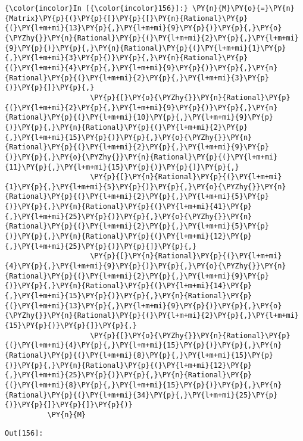     \begin{Verbatim}[commandchars=\\\{\}]
{\color{incolor}In [{\color{incolor}156}]:} \PY{n}{M}\PY{o}{=}\PY{n}{Matrix}\PY{p}{(}\PY{p}{[}\PY{p}{[}\PY{n}{Rational}\PY{p}{(}\PY{l+m+mi}{13}\PY{p}{,}\PY{l+m+mi}{9}\PY{p}{)}\PY{p}{,}\PY{o}{\PYZhy{}}\PY{n}{Rational}\PY{p}{(}\PY{l+m+mi}{2}\PY{p}{,}\PY{l+m+mi}{9}\PY{p}{)}\PY{p}{,}\PY{n}{Rational}\PY{p}{(}\PY{l+m+mi}{1}\PY{p}{,}\PY{l+m+mi}{3}\PY{p}{)}\PY{p}{,}\PY{n}{Rational}\PY{p}{(}\PY{l+m+mi}{4}\PY{p}{,}\PY{l+m+mi}{9}\PY{p}{)}\PY{p}{,}\PY{n}{Rational}\PY{p}{(}\PY{l+m+mi}{2}\PY{p}{,}\PY{l+m+mi}{3}\PY{p}{)}\PY{p}{]}\PY{p}{,}
                    \PY{p}{[}\PY{o}{\PYZhy{}}\PY{n}{Rational}\PY{p}{(}\PY{l+m+mi}{2}\PY{p}{,}\PY{l+m+mi}{9}\PY{p}{)}\PY{p}{,}\PY{n}{Rational}\PY{p}{(}\PY{l+m+mi}{10}\PY{p}{,}\PY{l+m+mi}{9}\PY{p}{)}\PY{p}{,}\PY{n}{Rational}\PY{p}{(}\PY{l+m+mi}{2}\PY{p}{,}\PY{l+m+mi}{15}\PY{p}{)}\PY{p}{,}\PY{o}{\PYZhy{}}\PY{n}{Rational}\PY{p}{(}\PY{l+m+mi}{2}\PY{p}{,}\PY{l+m+mi}{9}\PY{p}{)}\PY{p}{,}\PY{o}{\PYZhy{}}\PY{n}{Rational}\PY{p}{(}\PY{l+m+mi}{11}\PY{p}{,}\PY{l+m+mi}{15}\PY{p}{)}\PY{p}{]}\PY{p}{,}
                    \PY{p}{[}\PY{n}{Rational}\PY{p}{(}\PY{l+m+mi}{1}\PY{p}{,}\PY{l+m+mi}{5}\PY{p}{)}\PY{p}{,}\PY{o}{\PYZhy{}}\PY{n}{Rational}\PY{p}{(}\PY{l+m+mi}{2}\PY{p}{,}\PY{l+m+mi}{5}\PY{p}{)}\PY{p}{,}\PY{n}{Rational}\PY{p}{(}\PY{l+m+mi}{41}\PY{p}{,}\PY{l+m+mi}{25}\PY{p}{)}\PY{p}{,}\PY{o}{\PYZhy{}}\PY{n}{Rational}\PY{p}{(}\PY{l+m+mi}{2}\PY{p}{,}\PY{l+m+mi}{5}\PY{p}{)}\PY{p}{,}\PY{n}{Rational}\PY{p}{(}\PY{l+m+mi}{12}\PY{p}{,}\PY{l+m+mi}{25}\PY{p}{)}\PY{p}{]}\PY{p}{,}
                    \PY{p}{[}\PY{n}{Rational}\PY{p}{(}\PY{l+m+mi}{4}\PY{p}{,}\PY{l+m+mi}{9}\PY{p}{)}\PY{p}{,}\PY{o}{\PYZhy{}}\PY{n}{Rational}\PY{p}{(}\PY{l+m+mi}{2}\PY{p}{,}\PY{l+m+mi}{9}\PY{p}{)}\PY{p}{,}\PY{n}{Rational}\PY{p}{(}\PY{l+m+mi}{14}\PY{p}{,}\PY{l+m+mi}{15}\PY{p}{)}\PY{p}{,}\PY{n}{Rational}\PY{p}{(}\PY{l+m+mi}{13}\PY{p}{,}\PY{l+m+mi}{9}\PY{p}{)}\PY{p}{,}\PY{o}{\PYZhy{}}\PY{n}{Rational}\PY{p}{(}\PY{l+m+mi}{2}\PY{p}{,}\PY{l+m+mi}{15}\PY{p}{)}\PY{p}{]}\PY{p}{,}
                    \PY{p}{[}\PY{o}{\PYZhy{}}\PY{n}{Rational}\PY{p}{(}\PY{l+m+mi}{4}\PY{p}{,}\PY{l+m+mi}{15}\PY{p}{)}\PY{p}{,}\PY{n}{Rational}\PY{p}{(}\PY{l+m+mi}{8}\PY{p}{,}\PY{l+m+mi}{15}\PY{p}{)}\PY{p}{,}\PY{n}{Rational}\PY{p}{(}\PY{l+m+mi}{12}\PY{p}{,}\PY{l+m+mi}{25}\PY{p}{)}\PY{p}{,}\PY{n}{Rational}\PY{p}{(}\PY{l+m+mi}{8}\PY{p}{,}\PY{l+m+mi}{15}\PY{p}{)}\PY{p}{,}\PY{n}{Rational}\PY{p}{(}\PY{l+m+mi}{34}\PY{p}{,}\PY{l+m+mi}{25}\PY{p}{)}\PY{p}{]}\PY{p}{]}\PY{p}{)}
          \PY{n}{M}
\end{Verbatim}
\texttt{\color{outcolor}Out[{\color{outcolor}156}]:}
    
